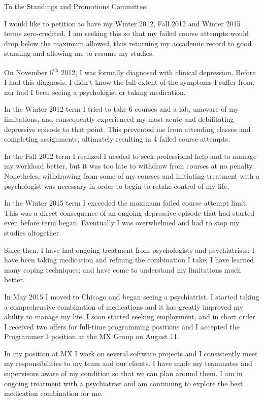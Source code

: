 \documentclass{letter}
\begin{document}
\begin{letter}{}
    \opening{To the Standings and Promotions Committee:}
    I would like to petition to have my Winter 2012, Fall 2012 and Winter 2015
    terms zero-credited.  I am seeking this so that my failed course attempts
    would drop below the maximum allowed, thus returning my accademic record to
    good standing and allowing me to resume my studies.

    On November 6\textsuperscript{th} 2012,
    I was formally diagnosed with clinical depression.
    Before I had this diagnosis,
    I didn't know the full extent of the symptoms I suffer from,
    nor had I been seeing a psychologist or taking medication.

    In the Winter 2012 term I tried to take 6 courses and a lab,
    unaware of my limitations, and consequently experienced
    my most acute and debilitating depressive episode to that point.
    This prevented me from attending classes and completing assignments,
    ultimately resulting in 4 failed course attempts.

    In the Fall 2012 term I realized I needed to seek professional help
    and to manage my workload better,
    but it was too late to withdraw from courses at no penalty.
    Nonetheles, withdrawing from some of my courses
    and initiating treatment with a psychologist
    was necessary in order to begin to retake control of my life.

    In the Winter 2015 term I exceeded the maximum failed course attempt limit.
    This was a direct consequence of an ongoing depressive episode that had
    started even before term began.
    Eventually I was overwhelmed and had to stop my studies altogether.

    Since then,
    I have had ongoing treatment from psychologists and psychiatrists;
    I have been taking medication and refining the combination I take;
    I have learned many coping techniques;
    and have come to understand my limitations much better.

    In May 2015 I moved to Chicago and began seeing a psychiatrist.
    I started taking a comprehensive combination of medications
    and it has greatly improved my ability to manage my life.
    I soon started seeking employment,
    and in short order I received two offers for full-time programming positions
    and I accepted the Programmer 1 position at the MX Group on August 11.

    In my position at MX I work on several software projects and
    I consistently meet my responsibilities to my team and our clients.
    I have made my teammates and supervisors aware of my condition
    so that we can plan around them.
    I am in ongoing treatment with a psychiatrist and am continuing to explore
    the best medication combination for me.


\end{letter}
\end{document}
